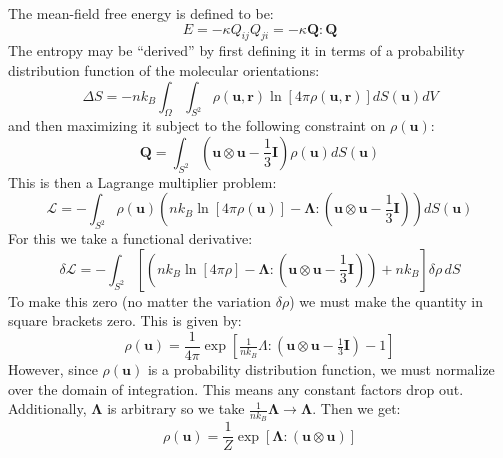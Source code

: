 \documentclass[reqno]{article}
\newcommand{\Q}{\mathbf{Q}}
\newcommand{\bLambda}{\boldsymbol{\Lambda}}
\begin{document}
The mean-field free energy is defined to be:
\begin{equation}
    E
    =
    -\kappa Q_{ij} Q_{ji}
    =
    -\kappa \Q : \Q
\end{equation}
The entropy may be ``derived'' by first defining it in terms of a probability distribution function of the molecular orientations:
\begin{equation}
    \Delta S
    =
    -n k_B \int_\Omega \int_{S^2} \rho(\mathbf u, \mathbf r) \ln \left[ 4 \pi \rho(\mathbf u, \mathbf r) \right] dS(\mathbf u) dV
\end{equation}
and then maximizing it subject to the following constraint on $\rho(\mathbf u)$:
\begin{equation}
    \Q
    =
    \int_{S^2} \left(
        \mathbf u \otimes \mathbf u - \frac13 \mathbf I 
    \right) \rho(\mathbf u) dS(\mathbf u)
\end{equation}
This is then a Lagrange multiplier problem:
\begin{equation}
    \mathcal L
    =
    -\int_{S^2} \rho(\mathbf u) \left( 
        n k_B \ln \left[ 4 \pi \rho(\mathbf u) \right] 
        - \bLambda : \left(\mathbf u \otimes \mathbf u - \frac13 \mathbf I\right)
    \right)
    dS(\mathbf u)
\end{equation}
For this we take a functional derivative:
\begin{equation}
    \delta \mathcal L
    =
    -\int_{S^2}
    \left[
        \left( 
            n k_B \ln \left[ 4 \pi \rho \right] 
            - \bLambda : \left(\mathbf u \otimes \mathbf u - \frac13 \mathbf I\right)
        \right)
        +
        n k_B
    \right] \delta \rho \, dS
\end{equation}
To make this zero (no matter the variation $\delta \rho$) we must make the quantity in square brackets zero.
This is given by:
\begin{equation}
    \rho(\mathbf u)
    =
    \frac{1}{4 \pi}
    \exp \left[
        \tfrac{1}{n k_B} \Lambda : \left( \mathbf u \otimes \mathbf u - \tfrac13 \mathbf I \right) - 1
    \right]
\end{equation}
However, since $\rho( \mathbf u )$ is a probability distribution function, we must normalize over the domain of integration.
This means any constant factors drop out.
Additionally, $\bLambda$ is arbitrary so we take $\tfrac{1}{n k_B} \bLambda \to \bLambda$.
Then we get:
\begin{equation}
    \rho(\mathbf u)
    =
    \frac{1}{Z} \exp \left[ \bLambda : \left( \mathbf u \otimes \mathbf u \right) \right]
\end{equation}
\end{document}
